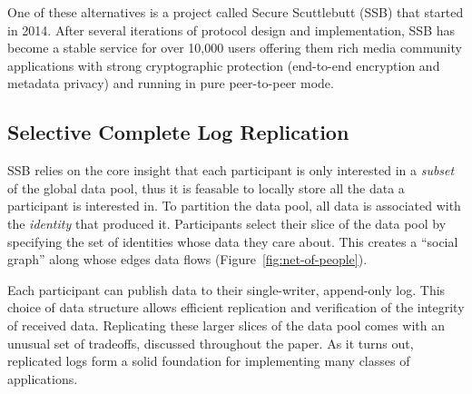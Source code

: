\documentclass[9pt,sigconf,rewiew]{acmart}
\begin{document}
One of these alternatives is a project called Secure Scuttlebutt (SSB)
that started in 2014. After several iterations of protocol design and
implementation, SSB has become a stable service for over 10,000 users
offering them rich media community applications with strong
cryptographic protection (end-to-end encryption and metadata privacy)
and running in pure peer-to-peer mode.

\subsection*{Selective Complete Log Replication}

SSB relies on the core insight that each  participant is only interested in a \textit{subset} of the global data pool, thus it is feasable to locally store all the data a participant is interested in. To partition the data pool, all data is associated with the \textit{identity} that produced it. Participants select their slice of the data pool by specifying the set of identities whose data they care about. This creates a ``social graph'' along whose edges data flows (Figure~\ref{fig:net-of-people}).

Each participant can publish data to their single-writer, append-only log. This choice of data structure allows efficient replication and verification of the integrity of received data. Replicating these larger slices of the data pool comes with an unusual set of tradeoffs, discussed throughout the paper. As it turns out, replicated logs form a solid foundation for implementing many classes of applications.

\end{document}

